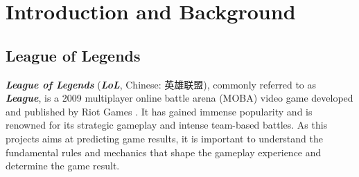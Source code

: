 \documentclass[11pt,a4paper,oneside]{report}
\newcommand{\instructions}[1]{{\color{orange}\itshape #1}}
\renewcommand{\instructions}[1]{}
\begin{document}

\setcounter{tocdepth}{1}
\listoftables\newpage


\clearpage
{}







\chapter{Introduction and Background}
\label{intro_and_background}


\section{League of Legends}

\textbf{\textit{League of Legends}} \cite{lol} (\textbf{\textit{LoL}}, Chinese: 英雄联盟), commonly referred to as \textbf{\textit{League}}, is a 2009 multiplayer online battle arena (MOBA) video game developed and published by Riot Games \cite{wikipedia-2024-lol}.
It has gained immense popularity and is renowned for its strategic gameplay and intense team-based battles. As this projects aims at predicting game results, it is important to understand the fundamental rules and mechanics that shape the gameplay experience and determine the game result.
\end{document}
